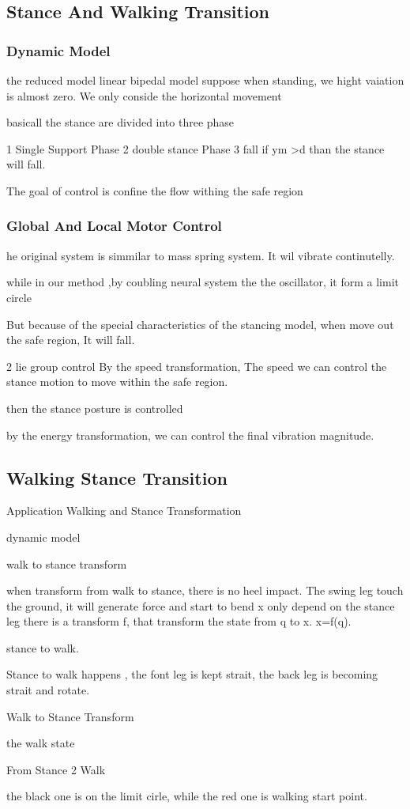 \subsection{Stance And Walking Transition}
\subsubsection{Dynamic Model}
the reduced model
linear bipedal model
suppose when standing, we hight vaiation is almost zero.
We only conside the horizontal movement


basicall the stance are divided into three phase

1 Single Support Phase
2 double stance Phase
3 fall 
if ym >d
than the stance will fall.

The goal of control is confine the flow withing the safe region
\subsubsection{Global And Local Motor Control}
he original system is simmilar to mass spring system.
It wil vibrate continutelly.




while in our method ,by coubling neural system the the oscillator, it form a limit circle

But because of the special characteristics of the stancing model, when move out the safe region, 
It will fall.

2 lie group control
By the speed transformation,
The speed we can control the stance motion to move within the safe region.

then the stance posture is controlled

by the energy transformation,
we can control the final vibration magnitude.
\subsection{Walking Stance Transition}
Application 
Walking and Stance Transformation



dynamic model

walk to stance transform

when transform from walk to stance, there is no heel impact.
The swing leg touch the ground, it will generate force and start to bend
x only depend on the stance leg
there is a transform f, that transform the state from q to x.
x=f(q).

stance to walk.

Stance to walk happens , the font leg is kept strait, the back leg is becoming strait and rotate.


Walk to Stance Transform

the walk state


From Stance 2 Walk

the black one is on the limit cirle, while the red one is walking start point.

